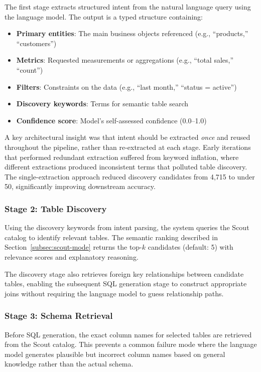 The first stage extracts structured intent from the natural language query using the language model. The output is a typed structure containing:

\begin{itemize}
    \item \textbf{Primary entities}: The main business objects referenced (e.g., ``products,'' ``customers'')
    \item \textbf{Metrics}: Requested measurements or aggregations (e.g., ``total sales,'' ``count'')
    \item \textbf{Filters}: Constraints on the data (e.g., ``last month,'' ``status = active'')
    \item \textbf{Discovery keywords}: Terms for semantic table search
    \item \textbf{Confidence score}: Model's self-assessed confidence (0.0--1.0)
\end{itemize}

A key architectural insight was that intent should be extracted \emph{once} and reused throughout the pipeline, rather than re-extracted at each stage. Early iterations that performed redundant extraction suffered from keyword inflation, where different extractions produced inconsistent terms that polluted table discovery. The single-extraction approach reduced discovery candidates from 4,715 to under 50, significantly improving downstream accuracy.

\subsubsection{Stage 2: Table Discovery}

Using the discovery keywords from intent parsing, the system queries the Scout catalog to identify relevant tables. The semantic ranking described in Section~\ref{subsec:scout-mode} returns the top-$k$ candidates (default: 5) with relevance scores and explanatory reasoning.

The discovery stage also retrieves foreign key relationships between candidate tables, enabling the subsequent SQL generation stage to construct appropriate joins without requiring the language model to guess relationship paths.

\subsubsection{Stage 3: Schema Retrieval}

Before SQL generation, the exact column names for selected tables are retrieved from the Scout catalog. This prevents a common failure mode where the language model generates plausible but incorrect column names based on general knowledge rather than the actual schema.

